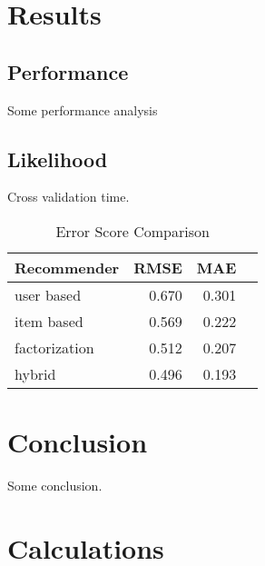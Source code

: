 \documentclass[sigconf, fleqn]{acmart}
\begin{document}
\section{Results}
\subsection{Performance}
Some performance analysis


\subsection{Likelihood}
\label{sec:results:likelihood}
Cross validation time.
\begin{table}[htbp]
	\caption{Error Score Comparison}
	\label{tab:results:errors}
	\begin{tabular}{lrrr}
		\toprule
		Recommender   & RMSE  & MAE   \\
		\midrule
		user based    & 0.670 & 0.301 \\
		item based    & 0.569 & 0.222 \\
		factorization & 0.512 & 0.207 \\
		hybrid        & 0.496 & 0.193 \\
		\bottomrule
	\end{tabular}
\end{table}
\FloatBarrier


\section{Conclusion}
Some conclusion.

\typeout{}



\clearpage
\appendix
\section{Calculations}
\end{document}
